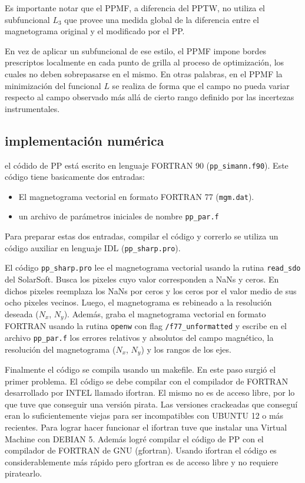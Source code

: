 \documentclass[a4paper,10pt]{article}
\begin{document}
Es importante notar que el PPMF, a diferencia del PPTW, no utiliza el subfuncional $L_3$ que provee una medida global de la diferencia entre el magnetograma original y el modificado por el PP. 

En vez de aplicar un subfuncional de ese estilo, el PPMF impone bordes prescriptos localmente en cada punto de grilla al proceso de optimización, los cuales no deben sobrepasarse en el mismo. En otras palabras, en el PPMF la minimización del funcional $L$ se realiza de forma que el campo no pueda variar respecto al campo observado más allá de cierto rango definido por las incertezas instrumentales.
 

\subsection{implementación numérica}

el códido de PP está escrito en lenguaje FORTRAN 90 ({\tt pp\_simann.f90}). Este código tiene basicamente dos entradas:
\begin{itemize}
 \item El magnetograma vectorial en formato FORTRAN 77 ({\tt mgm.dat}).
 \item un archivo de parámetros iniciales de nombre {\tt pp\_par.f}
\end{itemize}

Para preparar estas dos entradas, compilar el código y correrlo se utiliza un código auxiliar en lenguaje IDL ({\tt pp\_sharp.pro}). 

El código {\tt pp\_sharp.pro} lee el magnetograma vectorial usando la rutina {\tt read\_sdo} del SolarSoft. Busca los pixeles cuyo valor corresponden a NaNs y ceros. En dichos pixeles reemplaza los NaNs por ceros y los ceros por el valor medio de sus ocho pixeles vecinos.
%
Luego, el magnetograma es rebineado a la resolución deseada ($N_x$, $N_y$). 
%
Además, graba el magnetograma vectorial en formato FORTRAN usando la rutina {\tt openw} con flag {\tt /f77\_unformatted} y escribe en el archivo {\tt pp\_par.f}  los errores relativos y absolutos del campo magnético, la resolución del magnetograma ($N_x$, $N_y$) y los rangos de los ejes.

Finalmente el código se compila usando un makefile. En este paso surgió el primer problema. El código se debe compilar con el compilador de FORTRAN desarrollado por INTEL llamado ifortran. El mismo no es de acceso libre, por lo que tuve que conseguir una versión pirata. Las versiones crackeadas que conseguí eran lo suficientemente viejas para ser incompatibles con UBUNTU 12 o más recientes. Para lograr hacer funcionar el ifortran tuve que instalar una Virtual Machine con DEBIAN 5.  
%
Además logré compilar el código de PP con el compilador de FORTRAN de GNU (gfortran).
%
Usando ifortran el código es considerablemente más rápido pero gfortran es de acceso libre y no requiere piratearlo.\\
\end{document}
